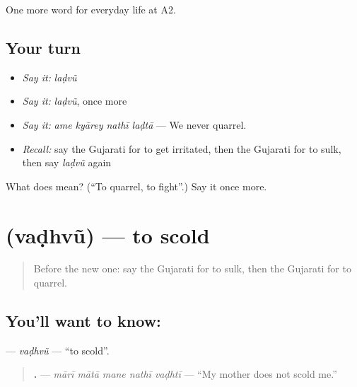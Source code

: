\begin{grammarlens}[title={What you've built}]
One more word for everyday life at A2.
\end{grammarlens}

\subsection*{Your turn}
\begin{itemize}
\raggedright
  \item \emph{Say it:} \emph{laḍvũ}
  \item \emph{Say it:} \emph{laḍvũ}, once more
  \item \emph{Say it:} \emph{ame kyārey nathī laḍtā} — We never quarrel.
  \item \emph{Recall:} say the Gujarati for to get irritated, then the Gujarati for to sulk, then say \emph{laḍvũ} again
\end{itemize}

\begin{tcolorbox}[breakable,colback=teal!4,colframe=teal!35!black,title={Before you move on}]
What does  mean? (\textquotedblleft{}To quarrel, to fight\textquotedblright{}.) Say it once more.
\end{tcolorbox}
\section[\texorpdfstring{\gu{વઢવું} (vaḍhvũ)}{વઢવું (vaḍhvũ)}]{ (vaḍhvũ) — to scold}

\label{lesson:GU-C268-vadhvu-scold}



\begin{quote}
Before the new one: say the Gujarati for to sulk, then the Gujarati for to quarrel.
\end{quote}

\subsection*{You'll want to know: }
\textbf{} — \emph{vaḍhvũ} — \textquotedblleft{}to scold\textquotedblright{}.

\begin{quote}
\textbf{    .} — \emph{mārī mātā mane nathī vaḍhtī} — \textquotedblleft{}My mother does not scold me.\textquotedblright{}
\end{quote}

